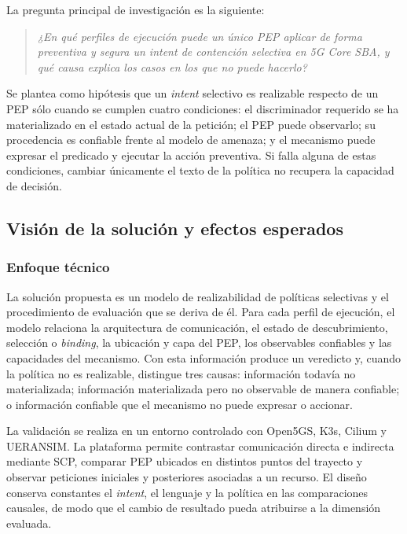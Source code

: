 La pregunta principal de investigación es la siguiente:

\begin{quote}
\textit{¿En qué perfiles de ejecución puede un único PEP aplicar de forma preventiva y segura un intent de contención selectiva en 5G Core SBA, y qué causa explica los casos en los que no puede hacerlo?}
\end{quote}

Se plantea como hipótesis que un \textit{intent} selectivo es realizable respecto de un PEP sólo cuando se cumplen cuatro condiciones: el discriminador requerido se ha materializado en el estado actual de la petición; el PEP puede observarlo; su procedencia es confiable frente al modelo de amenaza; y el mecanismo puede expresar el predicado y ejecutar la acción preventiva. Si falla alguna de estas condiciones, cambiar únicamente el texto de la política no recupera la capacidad de decisión.

\subsection{Visión de la solución y efectos esperados}
\label{subsec:vision-solucion-cap1}

\subsubsection*{Enfoque técnico}

La solución propuesta es un modelo de realizabilidad de políticas selectivas y el procedimiento de evaluación que se deriva de él. Para cada perfil de ejecución, el modelo relaciona la arquitectura de comunicación, el estado de descubrimiento, selección o \textit{binding}, la ubicación y capa del PEP, los observables confiables y las capacidades del mecanismo. Con esta información produce un veredicto y, cuando la política no es realizable, distingue tres causas: información todavía no materializada; información materializada pero no observable de manera confiable; o información confiable que el mecanismo no puede expresar o accionar.

La validación se realiza en un entorno controlado con Open5GS, K3s, Cilium y UERANSIM. La plataforma permite contrastar comunicación directa e indirecta mediante SCP, comparar PEP ubicados en distintos puntos del trayecto y observar peticiones iniciales y posteriores asociadas a un recurso. El diseño conserva constantes el \textit{intent}, el lenguaje y la política en las comparaciones causales, de modo que el cambio de resultado pueda atribuirse a la dimensión evaluada.

